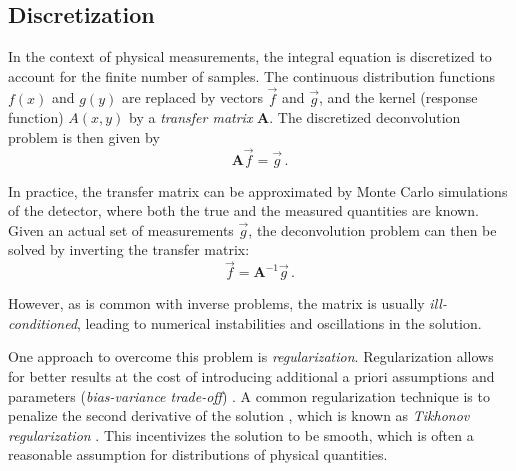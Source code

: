\subsection{Discretization} \label{sec:dsea:deconvolution_problem:discretization}
In the context of physical measurements,
the integral equation is discretized
  to account for the finite number of samples.
The continuous distribution functions $f(x)$ and $g(y)$ are replaced by vectors $\vec{f}$ and $\vec{g}$,
and the kernel (response function) $A(x, y)$ by a \emph{transfer matrix} $\symbf{A}$.
%
The discretized deconvolution problem is then given by
\begin{equation}
  \label{eq:deconvolution_problem:discretized}
  \symbf{A} \vec{f} = \vec{g} \, .
\end{equation}

In practice,
the transfer matrix can be approximated
by Monte Carlo simulations of the detector,
  where both the true and the measured quantities are known.
Given an actual set of measurements $\vec{g}$,
the deconvolution problem can then be solved
by inverting the transfer matrix:
\begin{equation}
  \label{eq:deconvolution_problem:discretized:inverse}
  \vec{f} = \symbf{A}^{-1} \vec{g} \, .
\end{equation}

However,
as is common with inverse problems,
the matrix is usually \emph{ill-conditioned},
  leading to numerical instabilities
  and oscillations in the solution.


 \label{sec:dsea:deconvolution_problem:regularization}
One approach to overcome this problem
is \emph{regularization}.
Regularization allows for better results
  at the cost of introducing additional a priori assumptions and parameters
    (\emph{bias-variance trade-off}) \cite{bias_variance_tradeoff}. %
A common regularization technique is
  to penalize the second derivative of the solution \cite{deconvolution_starck},
    which is known as \emph{Tikhonov regularization} \cite{tikhonov_regularization}.
This incentivizes the solution to be smooth,
  which is often a reasonable assumption for distributions of physical quantities.

